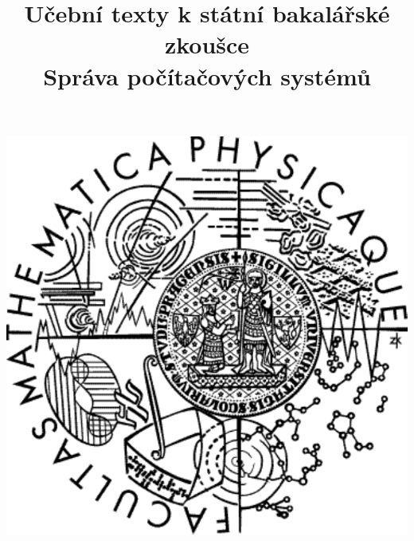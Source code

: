 \clearpage

\clearpage

\title{\LARGE Učební texty k státní bakalářské zkoušce \\ Správa počítačových systémů}




\maketitle

\vspace{10mm}
\begin{center}
\includegraphics[scale=0.5]{common/logo.pdf}
\end{center} 

\clearpage

\clearpage

\tableofcontents

\newpage

